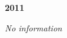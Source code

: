 \begin{center}
  \Huge
  \textbf{2011}
\end{center}

\begin{center}
  \textit{No information}
\end{center}

\vspace{50mm}

\pagebreak
